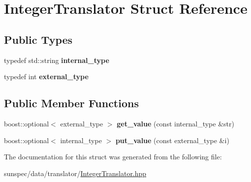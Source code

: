 \hypertarget{struct_integer_translator}{}\section{Integer\+Translator Struct Reference}
\label{struct_integer_translator}
\subsection*{Public Types}
\begin{DoxyCompactItemize}
\item 
\mbox{\label{struct_integer_translator_aafaf830779358b2d1f11f3c2c6ba54bd}} 
typedef std\+::string {\bfseries internal\+\_\+type}
\item 
\mbox{\label{struct_integer_translator_ae032a75a37d803e7a902e6f39ee674b7}} 
typedef int {\bfseries external\+\_\+type}
\end{DoxyCompactItemize}
\subsection*{Public Member Functions}
\begin{DoxyCompactItemize}
\item 
\mbox{\label{struct_integer_translator_adb637abd61c59e58efc0fd50ebdc968e}} 
boost\+::optional$<$ external\+\_\+type $>$ {\bfseries get\+\_\+value} (const internal\+\_\+type \&str)
\item 
\mbox{\label{struct_integer_translator_ae14a0e68147835c27929ee290aefe7d5}} 
boost\+::optional$<$ internal\+\_\+type $>$ {\bfseries put\+\_\+value} (const external\+\_\+type \&i)
\end{DoxyCompactItemize}


The documentation for this struct was generated from the following file\+:\begin{DoxyCompactItemize}
\item 
sunspec/data/translator/\hyperlink{_integer_translator_8hpp}{Integer\+Translator.\+hpp}\end{DoxyCompactItemize}
